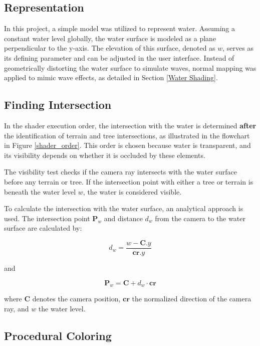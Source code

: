 \subsection{Representation}

In this project, a simple model was utilized to represent water. Assuming a constant water level globally, the water surface is modeled as a plane perpendicular to the y-axis. The elevation of this surface, denoted as $w$, serves as its defining parameter and can be adjusted in the user interface. Instead of geometrically distorting the water surface to simulate waves, normal mapping was applied to mimic wave effects, as detailed in Section \ref{Water Shading}.

\subsection{Finding Intersection}

In the shader execution order, the intersection with the water is determined \textbf{after} the identification of terrain and tree intersections, as illustrated in the flowchart in Figure \ref{shader_order}. This order is chosen because water is transparent, and its visibility depends on whether it is occluded by these elements.

The visibility test checks if the camera ray intersects with the water surface before any terrain or tree. If the intersection point with either a tree or terrain is beneath the water level $w$, the water is considered visible.

To calculate the intersection with the water surface, an analytical approach is used. The intersection point $\mathbf{P}_w$ and distance $d_w$ from the camera to the water surface are calculated by:

\begin{equation}
d_{w} = \frac{w - \mathbf{C}.y}{\mathbf{cr}.y}
\end{equation}

and

\begin{equation}
\mathbf{P}_{w} = \mathbf{C} + d_{w}\cdot\mathbf{cr}
\end{equation}

where $\mathbf{C}$ denotes the camera position, $\mathbf{cr}$ the normalized direction of the camera ray, and $w$ the water level.

\subsection{Procedural Coloring}

